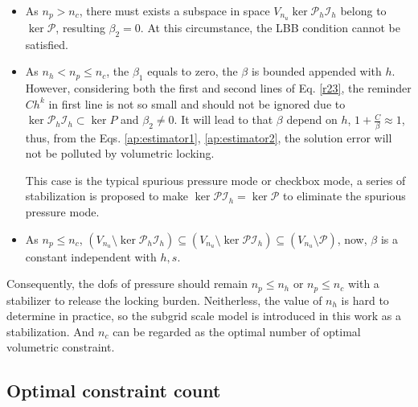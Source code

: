 \begin{pf}
\begin{itemize}
    \item As $n_p > n_c$, there must exists a subspace in space $V_{n_u}\ker \mathcal P_h \mathcal I_h$ belong to $\ker \mathcal P$, resulting $\beta_2 = 0$. At this circumstance, the LBB condition cannot be satisfied.
    \item As $n_h < n_p \le n_c$, the $\beta_1$ equals to zero, the $\beta$ is bounded appended with $h$. However, considering both the first and second lines of Eq. \eqref{r23}, the reminder $Ch^k$ in first line is not so small and should not be ignored due to $\ker \mathcal P_h \mathcal I_h \subset \ker P$ and $\beta_2 \ne 0$. 
        It will lead to that $\beta$ depend on $h$, $1+\frac{C}{\beta} \approx 1$, thus, from the Eqs. \eqref{ap:estimator1}, \eqref{ap:estimator2}, the solution error will not be polluted by volumetric locking. \cite{bathe2001}

    This case is the typical spurious pressure mode or checkbox mode, a series of stabilization \cite{vadala-roth2020} is proposed to make $\ker \mathcal P \mathcal I_h = \ker \mathcal P$ to eliminate the spurious pressure mode.
\item As $n_p \le n_c$, $(V_{n_u}\setminus \ker \mathcal P_h \mathcal I_h) \subseteq (V_{n_u}\setminus \ker \mathcal P \mathcal I_h) \subseteq (V_{n_u}\setminus \mathcal P)$, now, $\beta$ is a constant independent with $h,s$.
\end{itemize}

    Consequently, the dofs of pressure should remain $n_p\le n_h$ or $n_p\le n_c$ with a stabilizer to release the locking burden. Neitherless, the value of $n_h$ is hard to determine in practice, so the subgrid scale model \cite{hughes1986} is introduced in this work as a stabilization. And $n_c$ can be regarded as the optimal number of optimal volumetric constraint.
\end{pf}

\subsection{Optimal constraint count}

